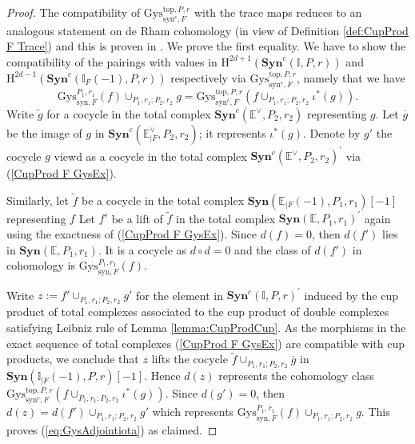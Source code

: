\documentclass[asterisque,english]{smfart}
\begin{document}
\begin{proof}
The compatibility of $\mathrm{Gys}_{\mathrm{syn}^{c},F}^{\mathrm{top},P,r}$
with the trace maps reduces to an analogous statement on de Rham cohomology
(in view of Definition \ref{def:CupProd F Trace}) and this is
proven in \cite[Prop. 4.3.7]{LLZ}. We prove the first equality. We have to show the compatibility of
the pairings with values in $\mathrm{H}^{2d+1}\left( \mathbf{Syn}^c\left( \mathbb{I},P,r\right) \right) $ and $\mathrm{H}^{2d-1}\left( 
\mathbf{Syn}^c\left( \mathbb{I}_{F}\left( -1\right),P,r \right) \right) $
respectively via $\mathrm{Gys}_{\mathrm{syn}^{c},F}^{\mathrm{top},P,r}$,
namely that we have
\begin{equation}\label{eq:GysAdjointiota}
\mathrm{Gys}_{\mathrm{syn},F}^{P_{1},r_{1}}\left( f\right) \cup _{P_{1},r_{1};P_{2},r_{2}}g=
\mathrm{Gys}^{\mathrm{top},P,r}_{\mathrm{syn}^c,F}\left( f\cup _{P_{1}
,r_{1};P_{2},r_{2}}\iota ^{\ast }\left( g\right) \right).
\end{equation} Write $\tilde{g}$ for a cocycle in the total  complex $ \mathbf{Syn}^{c}\left(
\mathbb{E}^{\vee },P_2,r_2\right)$ representing $g$. Let $\overline{g}$ be the image of $g$ in $ \mathbf{Syn}^{c}\left(\mathbb{E}^{\vee }_{\mid F},P_2,r_2\right)$; it represents $\iota^\ast(g)$. Denote by $g'$ the cocycle $g$ viewd as a cocycle in the total complex $ \mathbf{Syn}^{c}\left(
\mathbb{E}^{\vee },P_2,r_2\right)^\prime$ via (\ref{CupProd F GysEx}). 

Similarly, let $\tilde{f}$ be a cocycle in the total complex $\mathbf{Syn}\left( 
\mathbb{E}_{\mid F}\left( -1\right),P_1,r_1 \right)[-1]$  representing $f$
Let $f'$ be a lift of $\tilde{f}$  in the total complex $\mathbf{Syn}\left( 
\mathbb{E},P_1,r_1 \right)^\prime$ again using the exactness of (\ref{CupProd F GysEx}). Since $d(f)=0$, then $d(f')$ lies in $\mathbf{Syn}\left( \mathbb{E},P_1,r_1 \right)$. It is a cocycle as $d \circ d=0$ and the class of $d(f')$ in cohomology is $\mathrm{Gys}_{\mathrm{syn},F}^{P_{1},r_{1}}\left( f\right)$.

 

Write $z:=f' \cup _{P_{1},r_{1};P_{2},r_{2}} g'$ for the element in $\mathbf{Syn}^{c}\left(
\mathbb{I},P,r\right)^\prime$ induced by the cup product of total complexes associated to the cup product of double complexes satisfying Leibniz rule of Lemma \ref{lemma:CupProdCup}. As the morphisms in the exact sequence of total complexes (\ref{CupProd F GysEx}) are compatible with cup products, we conclude that $z$ lifts the cocycle $\tilde{f} \cup _{P_{1},r_{1};P_{2},r_{2}} \overline{g}$ in  $\mathbf{Syn}\left( 
\mathbb{I}_{\mid F}\left( -1\right),P,r\right)[-1]$. Hence $d(z)$ represents the cohomology class
$\mathrm{Gys}^{\mathrm{top},P,r}_{\mathrm{syn}^c,F}\left( f\cup _{P_{1}
,r_{1};P_{2},r_{2}}\iota ^{\ast }\left( g\right) \right)$. Since $d(g')=0$, then $d(z)=d(f')\cup _{P_ {1},r_{1};P_{2},r_{2}} g'$ which represents $\mathrm{Gys}_{\mathrm{syn},F}^{P_{1},r_{1}}\left( f\right)\cup _{P_{1},r_{1};P_{2},r_{2}} g$. This proves (\ref{eq:GysAdjointiota}) as claimed.
\end{proof}
\end{document}
